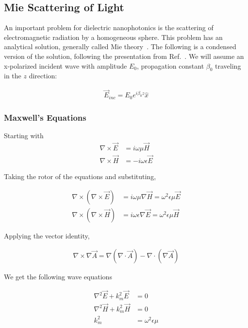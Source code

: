 \subsection{Mie Scattering of Light}
\label{ap:Mie}
    An important problem for dielectric nanophotonics is the scattering of electromagnetic radiation by
    a homogeneous sphere. This problem has an analytical solution, generally called Mie theory~\cite{mie1908beitrage}. The following
    is a condensed version of the solution, following the presentation from Ref.~\cite{ng2000manipulation}.
    We will assume an x-polarized incident wave with amplitude $E_0$, propagation constant $\beta_0$ traveling in the $z$ direction:

    \begin{align}
        \vec{E}_{inc} = E_0 e^{i\beta_0z}\hat{x}
    \end{align}

    \subsubsection{Maxwell's Equations}
        Starting with
        \begin{align}
            \nabla \times \vec{E} &= i\omega\mu\vec{H} \\
            \nabla \times \vec{H} &= -i\omega\epsilon\vec{E}
        \end{align}

        Taking the rotor of the equations and substituting,

        \begin{align}
            \nabla \times (\nabla \times \vec{E}) &= i\omega\mu \nabla \vec{H} = \omega^2 \epsilon\mu\vec{E} \\
            \nabla \times (\nabla \times \vec{H}) &= i\omega\epsilon \nabla \vec{E} = \omega^2 \epsilon\mu\vec{H}
        \end{align}

        Applying the vector identity,

        \begin{align}
            \nabla \times \nabla \vec{A} = \nabla (\nabla \cdot \vec{A}) - \nabla \cdot (\nabla\vec{A})
        \end{align}

        We get the following wave equations

        \begin{align}
            \nabla^2\vec{E} + k^2_m\vec{E} &= 0 \label{mie:waveE}\\
            \nabla^2\vec{H} + k^2_m\vec{H} &= 0 \label{mie:waveH}\\
            k^2_m &= \omega^2\epsilon\mu \label{mie:kvec}
        \end{align}

